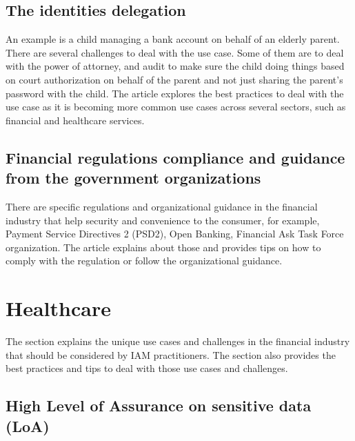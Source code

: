\hypertarget{the-identities-delegation}{%
\section{The identities delegation}\label{the-identities-delegation}}

An example is a child managing a bank account on behalf of an elderly
parent. There are several challenges to deal with the use case. Some of
them are to deal with the power of attorney, and audit to make sure the
child doing things based on court authorization on behalf of the parent
and not just sharing the parent's password with the child. The article
explores the best practices to deal with the use case as it is becoming
more common use cases across several sectors, such as financial and
healthcare services.

\hypertarget{financial-regulations-compliance-and-guidance-from-the-government-organizations}{%
\section{Financial regulations compliance and guidance from the
government
organizations}\label{financial-regulations-compliance-and-guidance-from-the-government-organizations}}

There are specific regulations and organizational guidance in the
financial industry that help security and convenience to the consumer,
for example, Payment Service Directives 2 (PSD2), Open Banking,
Financial Ask Task Force organization. The article explains about those
and provides tips on how to comply with the regulation or follow the
organizational guidance.

\hypertarget{healthcare}{%
\chapter{Healthcare}\label{healthcare}}

The section explains the unique use cases and challenges in the
financial industry that should be considered by IAM practitioners. The
section also provides the best practices and tips to deal with those use
cases and challenges.

\hypertarget{high-level-of-assurance-on-sensitive-data-loa}{%
\section{High Level of Assurance on sensitive data
(LoA)}\label{high-level-of-assurance-on-sensitive-data-loa}}

